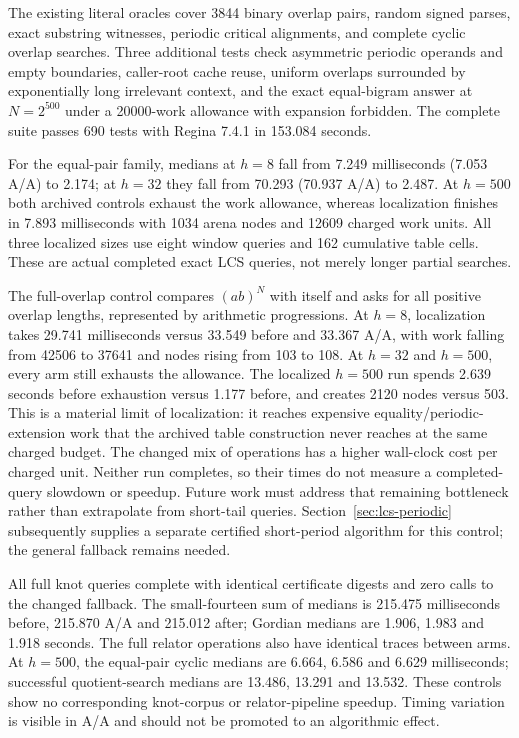 The existing literal oracles cover 3844 binary overlap pairs, random
signed parses, exact substring witnesses, periodic critical alignments,
and complete cyclic overlap searches. Three additional tests check
asymmetric periodic operands and empty boundaries, caller-root cache
reuse, uniform overlaps surrounded by exponentially long irrelevant
context, and the exact equal-bigram answer at $N=2^{500}$ under a
20000-work allowance with expansion forbidden. The complete suite passes
690 tests with Regina 7.4.1 in 153.084 seconds.





For the equal-pair family, medians at $h=8$ fall from 7.249 milliseconds
(7.053 A/A) to 2.174; at $h=32$ they fall from 70.293 (70.937 A/A) to
2.487. At $h=500$ both archived controls exhaust the work allowance,
whereas localization finishes in 7.893 milliseconds with 1034 arena
nodes and 12609 charged work units. All three localized sizes use eight
window queries and 162 cumulative table cells. These are actual completed
exact LCS queries, not merely longer partial searches.

The full-overlap control compares $(ab)^N$ with itself and asks for all
positive overlap lengths, represented by arithmetic progressions. At
$h=8$, localization takes 29.741 milliseconds versus 33.549 before and
33.367 A/A, with work falling from 42506 to 37641 and nodes rising from
103 to 108. At $h=32$ and $h=500$, every arm still exhausts the allowance.
The localized $h=500$ run spends 2.639 seconds before exhaustion versus
1.177 before, and creates 2120 nodes versus 503. This is a material limit
of localization: it reaches expensive equality/periodic-extension work
that the archived table construction never reaches at the same charged
budget. The changed mix of operations has a higher wall-clock cost per
charged unit. Neither run completes, so their times do not measure a
completed-query slowdown or speedup. Future work must address that
remaining bottleneck rather than extrapolate from short-tail queries.
Section~\ref{sec:lcs-periodic} subsequently supplies a separate certified
short-period algorithm for this control; the general fallback remains needed.

All full knot queries complete with identical certificate digests and
zero calls to the changed fallback. The small-fourteen sum of medians
is 215.475 milliseconds before, 215.870 A/A and 215.012 after; Gordian
medians are 1.906, 1.983 and 1.918 seconds. The full relator operations
also have identical traces between arms. At $h=500$, the equal-pair
cyclic medians are 6.664, 6.586 and 6.629 milliseconds; successful
quotient-search medians are 13.486, 13.291 and 13.532. These controls
show no corresponding knot-corpus or relator-pipeline speedup. Timing
variation is visible in A/A and should not be promoted to an algorithmic
effect.

